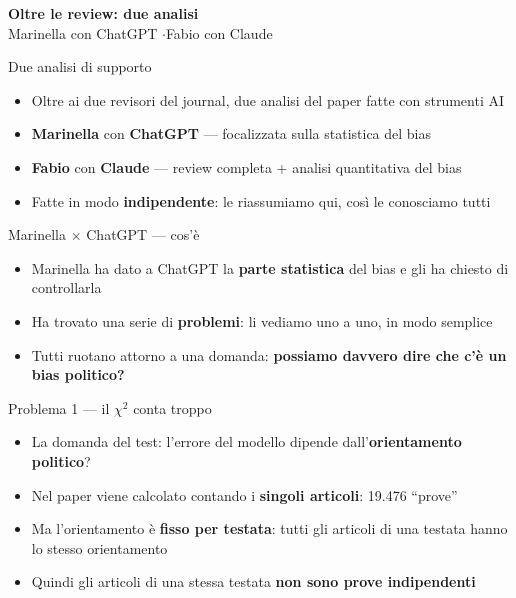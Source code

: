 \documentclass[aspectratio=169]{beamer}
\newcommand{\hl}[1]{\textbf{#1}}
\newcommand{\divider}[2]{%
  \begin{frame}[plain]
    \vfill
    \begin{center}
      {\color{dividerblue}\Huge\textbf{#1}}\\[0.8em]
      {\large #2}
    \end{center}
    \vfill
  \end{frame}}
\begin{document}
\divider{Oltre le review: due analisi}{Marinella con ChatGPT \quad$\cdot$\quad Fabio con Claude}

\begin{frame}{Due analisi di supporto}
  \vfill
  \begin{itemize}[<+->]
    \setlength\itemsep{0.9em}
    \item Oltre ai due revisori del journal, due analisi del paper fatte con strumenti AI
    \item \hl{Marinella} con \hl{ChatGPT} --- focalizzata sulla statistica del bias
    \item \hl{Fabio} con \hl{Claude} --- review completa + analisi quantitativa del bias
    \item Fatte in modo \hl{indipendente}: le riassumiamo qui, cos\`i le conosciamo tutti
  \end{itemize}
  \vfill
\end{frame}

\begin{frame}{Marinella $\times$ ChatGPT --- cos'\`e}
  \vfill
  \begin{itemize}[<+->]
    \setlength\itemsep{1.0em}
    \item Marinella ha dato a ChatGPT la \hl{parte statistica} del bias e gli ha chiesto di controllarla
    \item Ha trovato una serie di \hl{problemi}: li vediamo uno a uno, in modo semplice
    \item Tutti ruotano attorno a una domanda: \hl{possiamo davvero dire che c'\`e un bias politico?}
  \end{itemize}
  \vfill
\end{frame}

\begin{frame}{Problema 1 --- il $\chi^2$ conta troppo}
  \vfill
  \begin{itemize}[<+->]
    \setlength\itemsep{0.8em}
    \item La domanda del test: l'errore del modello dipende dall'\hl{orientamento politico}?
    \item Nel paper viene calcolato contando i \hl{singoli articoli}: 19.476 ``prove''
    \item Ma l'orientamento \`e \hl{fisso per testata}: tutti gli articoli di una testata hanno lo stesso orientamento
    \item Quindi gli articoli di una stessa testata \hl{non sono prove indipendenti}
  \end{itemize}
  \vfill
\end{frame}
\end{document}
